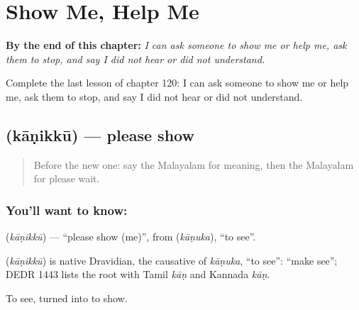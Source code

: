 
\chapter{Show Me, Help Me}
\label{ch:ml-show-me-help-me}

\begin{chapteropening}
\textbf{By the end of this chapter:} \emph{I can ask someone to show me or help me, ask them to stop, and say I did not hear or did not understand.}

Complete the last lesson of chapter 120: I can ask someone to show me or help me, ask them to stop, and say I did not hear or did not understand.
\end{chapteropening}

\section[\texorpdfstring{\ml{കാണിക്കൂ} (kāṇikkū)}{കാണിക്കൂ (kāṇikkū)}]{ (kāṇikkū) — please show}

\label{lesson:ML-C120-show}



\begin{quote}
Before the new one: say the Malayalam for meaning, then the Malayalam for please wait.
\end{quote}

\subsection*{You'll want to know: }
\textbf{} (\emph{kāṇikkū}) — \textquotedblleft{}please show (me)\textquotedblright{}, from \textbf{} (\emph{kāṇuka}), \textquotedblleft{}to see\textquotedblright{}.

\begin{cousinweb}
\textbf{} (\emph{kāṇikkū}) is native Dravidian, the causative of \emph{kāṇuka}, \textquotedblleft{}to see\textquotedblright{}: \textquotedblleft{}make see\textquotedblright{}; DEDR 1443 lists the root with Tamil \emph{kāṇ} and Kannada \emph{kāṇ}.
\end{cousinweb}

\begin{grammarlens}[title={What you've built}]
To see, turned into to show.
\end{grammarlens}

